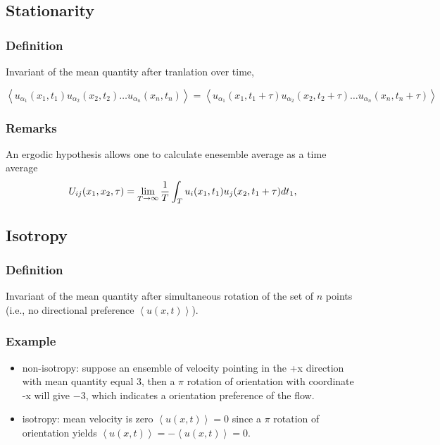 \subsection{Stationarity} 
\subsubsection{Definition} Invariant of the mean quantity after tranlation over time,

\begin{equation}
   \left< u_{\alpha_1}(x_1,t_1) u_{\alpha_2}(x_2,t_2) \dotsc u_{\alpha_n}(x_n,t_n) \right> = \left< u_{\alpha_1}(x_1,t_1+\tau) u_{\alpha_2}(x_2,t_2+\tau) \dotsc u_{\alpha_n}(x_n,t_n+\tau) \right>
\end{equation}

\subsubsection{Remarks} An ergodic hypothesis allows one to calculate enesemble average as a time average
         \begin{equation}
            U_{ij}(x_1,x_2,\tau) = \lim_{\substack T \rightarrow \infty} \frac{1}{T}\int_T u_i(x_1,t_1)u_j(x_2,t_1+\tau) dt_1,
         \end{equation}


\subsection{Isotropy}
\subsubsection{Definition} Invariant of the mean quantity after simultaneous rotation of the set of $n$ points (i.e., no directional preference $\left< u(x,t) \right>$).

\subsubsection{Example}
\begin{itemize}
   \item non-isotropy: suppose an ensemble of velocity pointing in the +x direction with mean quantity equal $3$, then a $\pi$ rotation of orientation with coordinate -x will give $-3$, which indicates a orientation preference of the flow. 
   \item isotropy: mean velocity is zero $\left< u(x,t) \right> = 0$ since a $\pi$ rotation of orientation yields $\left< u(x,t) \right> = -\left< u(x,t) \right> = 0$.
\end{itemize}
%
